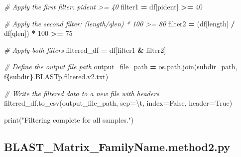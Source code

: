 \documentclass[
]{book}
\newenvironment{Shaded}{\begin{snugshade}}{\end{snugshade}}
\newcommand{\BuiltInTok}[1]{#1}
\newcommand{\CharTok}[1]{\textcolor[rgb]{0.31,0.60,0.02}{#1}}
\newcommand{\CommentTok}[1]{\textcolor[rgb]{0.56,0.35,0.01}{\textit{#1}}}
\newcommand{\DecValTok}[1]{\textcolor[rgb]{0.00,0.00,0.81}{#1}}
\newcommand{\NormalTok}[1]{#1}
\newcommand{\OperatorTok}[1]{\textcolor[rgb]{0.81,0.36,0.00}{\textbf{#1}}}
\newcommand{\SpecialCharTok}[1]{\textcolor[rgb]{0.81,0.36,0.00}{\textbf{#1}}}
\newcommand{\SpecialStringTok}[1]{\textcolor[rgb]{0.31,0.60,0.02}{#1}}
\newcommand{\StringTok}[1]{\textcolor[rgb]{0.31,0.60,0.02}{#1}}
\newcommand{\VariableTok}[1]{\textcolor[rgb]{0.00,0.00,0.00}{#1}}
\begin{document}
\begin{Shaded}
\begin{Highlighting}[]
            \CommentTok{\# Apply the first filter: pident \textgreater{}= 40}
\NormalTok{            filter1 }\OperatorTok{=}\NormalTok{ df[}\StringTok{\textquotesingle{}pident\textquotesingle{}}\NormalTok{] }\OperatorTok{\textgreater{}=} \DecValTok{40}
            
            \CommentTok{\# Apply the second filter: (length/qlen) * 100 \textgreater{}= 80}
\NormalTok{            filter2 }\OperatorTok{=}\NormalTok{ (df[}\StringTok{\textquotesingle{}length\textquotesingle{}}\NormalTok{] }\OperatorTok{/}\NormalTok{ df[}\StringTok{\textquotesingle{}qlen\textquotesingle{}}\NormalTok{]) }\OperatorTok{*} \DecValTok{100} \OperatorTok{\textgreater{}=} \DecValTok{75}

            \CommentTok{\# Apply both filters}
\NormalTok{            filtered\_df }\OperatorTok{=}\NormalTok{ df[filter1 }\OperatorTok{\&}\NormalTok{ filter2]}
            
            \CommentTok{\# Define the output file path}
\NormalTok{            output\_file\_path }\OperatorTok{=}\NormalTok{ os.path.join(subdir\_path, }\SpecialStringTok{f\textquotesingle{}}\SpecialCharTok{\{}\NormalTok{subdir}\SpecialCharTok{\}}\SpecialStringTok{.BLASTp.filtered.v2.txt\textquotesingle{}}\NormalTok{)}
            
            \CommentTok{\# Write the filtered data to a new file with headers}
\NormalTok{            filtered\_df.to\_csv(output\_file\_path, sep}\OperatorTok{=}\StringTok{\textquotesingle{}}\CharTok{\textbackslash{}t}\StringTok{\textquotesingle{}}\NormalTok{, index}\OperatorTok{=}\VariableTok{False}\NormalTok{, header}\OperatorTok{=}\VariableTok{True}\NormalTok{)}

\BuiltInTok{print}\NormalTok{(}\StringTok{"Filtering complete for all samples."}\NormalTok{)}
\end{Highlighting}
\end{Shaded}

\subsection{BLAST\_Matrix\_FamilyName.method2.py}\label{mxfnmeth2-script}
\end{document}
